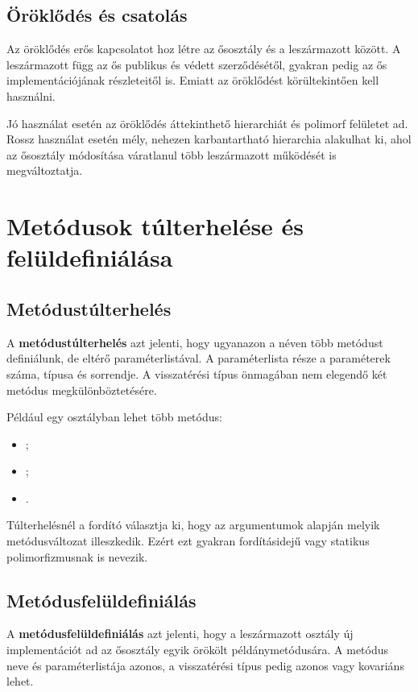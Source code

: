 \subsection{Öröklődés és csatolás}

Az öröklődés erős kapcsolatot hoz létre az ősosztály és a leszármazott között. A leszármazott függ az ős publikus és védett szerződésétől, gyakran pedig az ős implementációjának részleteitől is. Emiatt az öröklődést körültekintően kell használni.

Jó használat esetén az öröklődés áttekinthető hierarchiát és polimorf felületet ad. Rossz használat esetén mély, nehezen karbantartható hierarchia alakulhat ki, ahol az ősosztály módosítása váratlanul több leszármazott működését is megváltoztatja.

\section{Metódusok túlterhelése és felüldefiniálása}

\subsection{Metódustúlterhelés}

A \textbf{metódustúlterhelés} azt jelenti, hogy ugyanazon a néven több metódust definiálunk, de eltérő paraméterlistával. A paraméterlista része a paraméterek száma, típusa és sorrendje. A visszatérési típus önmagában nem elegendő két metódus megkülönböztetésére.

Például egy  osztályban lehet több  metódus:

\begin{itemize}
  \item {};
  \item {};
  \item {}.
\end{itemize}

Túlterhelésnél a fordító választja ki, hogy az argumentumok alapján melyik metódusváltozat illeszkedik. Ezért ezt gyakran fordításidejű vagy statikus polimorfizmusnak is nevezik.

\subsection{Metódusfelüldefiniálás}

A \textbf{metódusfelüldefiniálás} azt jelenti, hogy a leszármazott osztály új implementációt ad az ősosztály egyik örökölt példánymetódusára. A metódus neve és paraméterlistája azonos, a visszatérési típus pedig azonos vagy kovariáns lehet.

